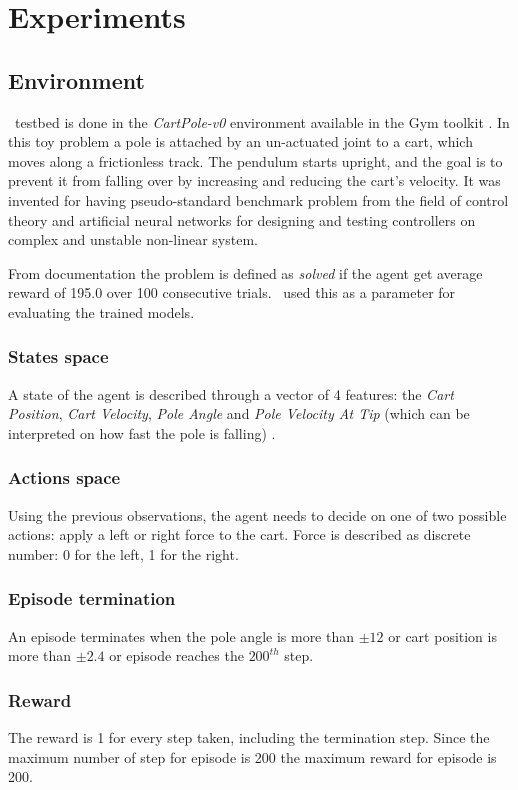 \section{Experiments}

\subsection{Environment}
\Authpp~testbed is done in the \textit{CartPole-v0} environment available in the Gym toolkit \cite{Gym}.
In this toy problem a pole is attached by an un-actuated joint to a cart, which moves along a frictionless track. The pendulum starts upright, and the goal is to prevent it from falling over by increasing and reducing the cart's velocity. It was invented for having pseudo-standard benchmark problem from the field of control theory and artificial neural networks for designing and testing controllers on complex and unstable non-linear system.

From documentation the problem is defined as \textit{solved} if the agent get average reward of 195.0 over 100 consecutive trials. \Auth~used this as a parameter for evaluating the trained models.
 
\subsubsection{States space}
A state of the agent is described through a vector of 4 features: the  \textit{Cart Position}, \textit{Cart Velocity}, \textit{Pole Angle} and \textit{Pole Velocity At Tip} (which can be interpreted on how fast the pole is falling) .

\subsubsection{Actions space}
Using the previous observations, the agent needs to decide on one of two possible actions: apply a left or right force to the cart. Force is described as discrete number: 0 for the left, 1 for the right.

\subsubsection{Episode termination}
An episode terminates when the pole angle is more than $\pm12$ or cart position is more than $\pm2.4$ or episode reaches the $200^{th}$ step.

\subsubsection{Reward}
The reward is 1 for every step taken, including the termination step. Since the maximum number of step for episode is 200 the maximum reward for episode is 200.


